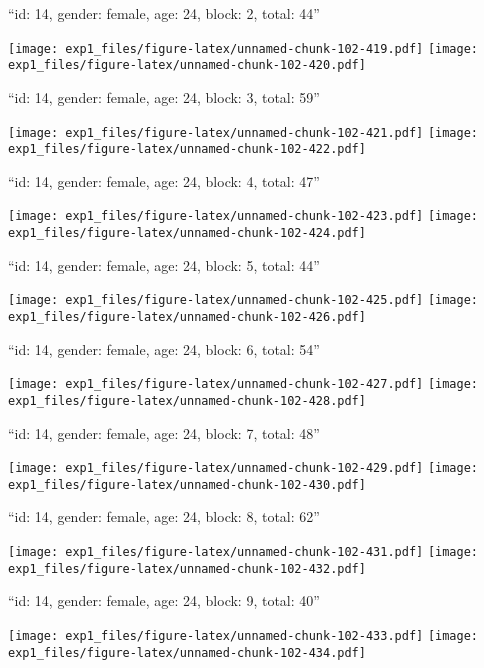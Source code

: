 \documentclass[11pt,,]{article}
\begin{document}
\newpage
[1] 

``id: 14, gender: female, age: 24, block: 2, total: 44''

\texttt{[image: exp1\_files/figure-latex/unnamed-chunk-102-419.pdf]}
\texttt{[image: exp1\_files/figure-latex/unnamed-chunk-102-420.pdf]}

\newpage
[1] 

``id: 14, gender: female, age: 24, block: 3, total: 59''

\texttt{[image: exp1\_files/figure-latex/unnamed-chunk-102-421.pdf]}
\texttt{[image: exp1\_files/figure-latex/unnamed-chunk-102-422.pdf]}

\newpage
[1] 

``id: 14, gender: female, age: 24, block: 4, total: 47''

\texttt{[image: exp1\_files/figure-latex/unnamed-chunk-102-423.pdf]}
\texttt{[image: exp1\_files/figure-latex/unnamed-chunk-102-424.pdf]}

\newpage
[1] 

``id: 14, gender: female, age: 24, block: 5, total: 44''

\texttt{[image: exp1\_files/figure-latex/unnamed-chunk-102-425.pdf]}
\texttt{[image: exp1\_files/figure-latex/unnamed-chunk-102-426.pdf]}

\newpage
[1] 

``id: 14, gender: female, age: 24, block: 6, total: 54''

\texttt{[image: exp1\_files/figure-latex/unnamed-chunk-102-427.pdf]}
\texttt{[image: exp1\_files/figure-latex/unnamed-chunk-102-428.pdf]}

\newpage
[1] 

``id: 14, gender: female, age: 24, block: 7, total: 48''

\texttt{[image: exp1\_files/figure-latex/unnamed-chunk-102-429.pdf]}
\texttt{[image: exp1\_files/figure-latex/unnamed-chunk-102-430.pdf]}

\newpage
[1] 

``id: 14, gender: female, age: 24, block: 8, total: 62''

\texttt{[image: exp1\_files/figure-latex/unnamed-chunk-102-431.pdf]}
\texttt{[image: exp1\_files/figure-latex/unnamed-chunk-102-432.pdf]}

\newpage
[1] 

``id: 14, gender: female, age: 24, block: 9, total: 40''

\texttt{[image: exp1\_files/figure-latex/unnamed-chunk-102-433.pdf]}
\texttt{[image: exp1\_files/figure-latex/unnamed-chunk-102-434.pdf]}
\end{document}
